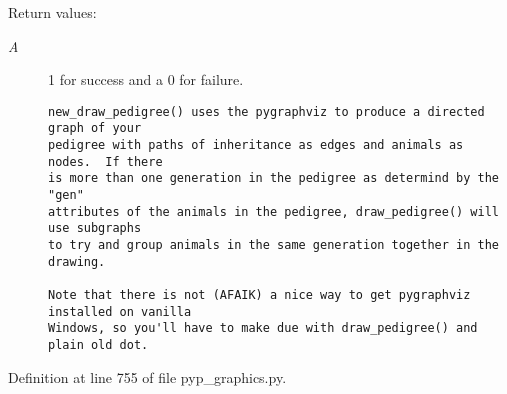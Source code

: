 \begin{Desc}
\item[Return values:]
\begin{description}
\item[{\em A}]1 for success and a 0 for failure.

\footnotesize\begin{verbatim}new_draw_pedigree() uses the pygraphviz to produce a directed graph of your
pedigree with paths of inheritance as edges and animals as nodes.  If there
is more than one generation in the pedigree as determind by the "gen"
attributes of the animals in the pedigree, draw_pedigree() will use subgraphs
to try and group animals in the same generation together in the drawing.

Note that there is not (AFAIK) a nice way to get pygraphviz installed on vanilla
Windows, so you'll have to make due with draw_pedigree() and plain old dot.
\end{verbatim}
\normalsize
 \end{description}
\end{Desc}


Definition at line 755 of file pyp\_\-graphics.py.